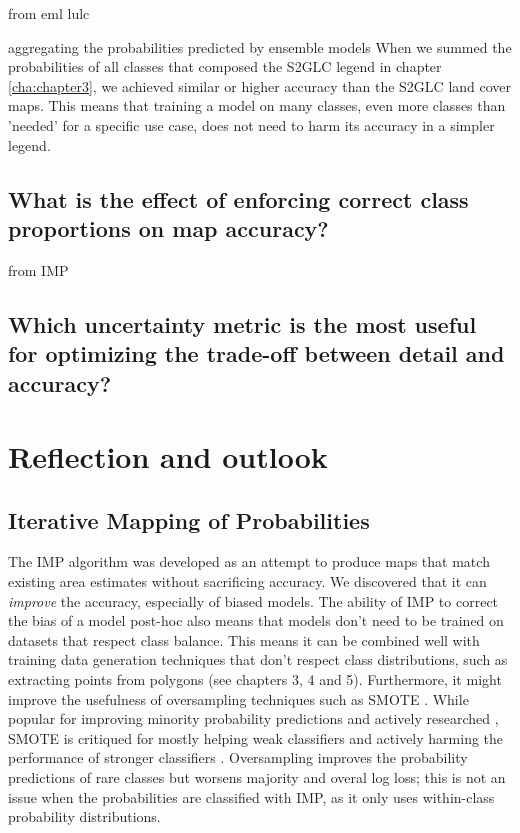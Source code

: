     from eml lulc
    
    aggregating the probabilities predicted by ensemble models 
    When we summed the probabilities of all classes that composed the S2GLC legend in chapter \ref{cha:chapter3}, we achieved similar or higher accuracy than the S2GLC land cover maps. This means that training a model on many classes, even more classes than 'needed' for a specific use case, does not need to harm its accuracy in a simpler legend.
    
    \subsection{What is the effect of enforcing correct class proportions on map accuracy?}
    
    from IMP
    
    \subsection{Which uncertainty metric is the most useful for optimizing the trade-off between detail and accuracy?}

\section{Reflection and outlook}
    
    \subsection{Iterative Mapping of Probabilities}

        The IMP algorithm was developed as an attempt to produce maps that match existing area estimates without sacrificing accuracy. We discovered that it can \textit{improve} the accuracy, especially of biased models. The ability of IMP to correct the bias of a model post-hoc also means that models don't need to be trained on datasets that respect class balance. This means it can be combined well with training data generation techniques that don't respect class distributions, such as extracting points from polygons (see chapters 3, 4 and 5). Furthermore, it might improve the usefulness of oversampling techniques such as SMOTE  \citep{chawla2002smote}. While popular for improving minority probability predictions \citep{elor2022smote} and actively researched \citep{douzas2019imbalanced}, SMOTE is critiqued for mostly helping weak classifiers and actively harming the performance of stronger classifiers \citep{elor2022smote}. Oversampling improves the probability predictions of rare classes but worsens majority and overal log loss; this is not an issue when the probabilities are classified with IMP, as it only uses within-class probability distributions.
        
